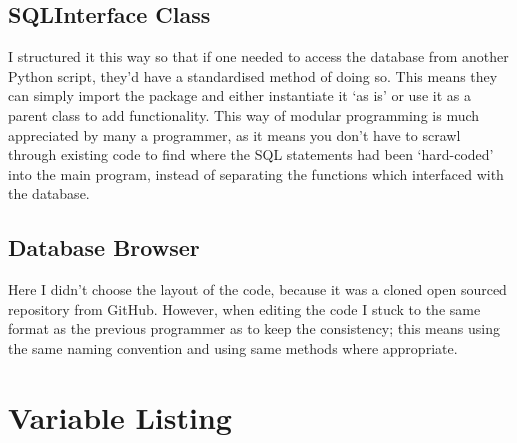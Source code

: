 \documentclass[a4paper]{article}
\begin{document}
    \subsection{SQLInterface Class}
    I structured it this way so that if one needed to access the database from another Python script, they'd
    have a standardised method of doing so. This means they can simply import the package and either instantiate it `as is'
    or use it as a parent class to add functionality. This way of modular programming is much appreciated by many a programmer,
    as it means you don't have to scrawl through existing code to find where the SQL statements had been `hard-coded' into the
    main program, instead of separating the functions which interfaced with the database.

    \subsection{Database Browser}
    Here I didn't choose the layout of the code, because it was a cloned open sourced repository from GitHub.
    However, when editing the code I stuck to the same format as the previous programmer as to keep the consistency; this
    means using the same naming convention and using same methods where appropriate.

\section{Variable Listing}
\end{document}
